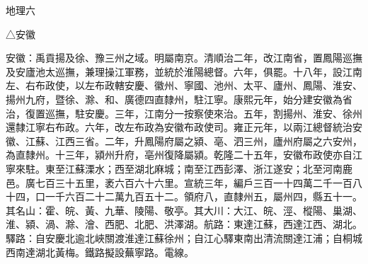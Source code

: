 
\begin{pinyinscope}
地理六

△安徽

安徽：禹貢揚及徐、豫三州之域。明屬南京。清順治二年，改江南省，置鳳陽巡撫及安廬池太巡撫，兼理操江軍務，並統於淮陽總督。六年，俱罷。十八年，設江南左、右布政使，以左布政轄安慶、徽州、寧國、池州、太平、廬州、鳳陽、淮安、揚州九府，暨徐、滁、和、廣德四直隸州，駐江寧。康熙元年，始分建安徽為省治，復置巡撫，駐安慶。三年，江南分一按察使來治。五年，割揚州、淮安、徐州還隸江寧右布政。六年，改左布政為安徽布政使司。雍正元年，以兩江總督統治安徽、江蘇、江西三省。二年，升鳳陽府屬之潁、亳、泗三州，廬州府屬之六安州，為直隸州。十三年，潁州升府，亳州復降屬潁。乾隆二十五年，安徽布政使亦自江寧來駐。東至江蘇溧水；西至湖北麻城；南至江西彭澤、浙江遂安；北至河南鹿邑。廣七百三十五里，袤六百六十六里。宣統三年，編戶三百一十四萬二千一百八十四，口一千六百二十二萬九百五十二。領府八，直隸州五，屬州四，縣五十一。其名山：霍、皖、黃、九華、陵陽、敬亭。其大川：大江、皖、涇、樅陽、巢湖、淮、潁、渦、滁、澮、西肥、北肥、洪澤湖。航路：東達江蘇，西達江西、湖北。驛路：自安慶北逾北峽關渡淮達江蘇徐州；自江心驛東南出清流關達江浦；自桐城西南達湖北黃梅。鐵路擬設蕪寧路。電線。


\end{pinyinscope}
